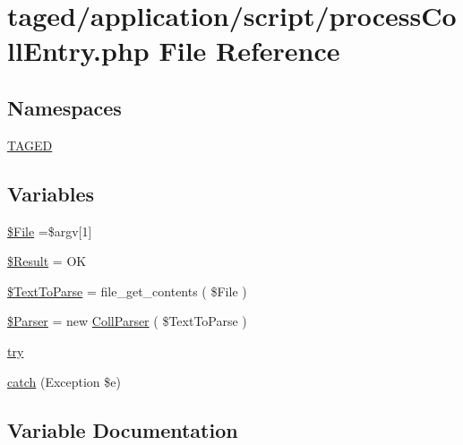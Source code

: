 \hypertarget{process_coll_entry_8php}{}\section{taged/application/script/process\+Coll\+Entry.php File Reference}
\label{process_coll_entry_8php}
\subsection*{Namespaces}
\begin{DoxyCompactItemize}
\item 
 \hyperlink{namespace_t_a_g_e_d}{T\+A\+G\+ED}
\end{DoxyCompactItemize}
\subsection*{Variables}
\begin{DoxyCompactItemize}
\item 
\hyperlink{process_coll_entry_8php_a34cd105e27a4cb6632047ddfdfaa07e8}{\$\+File} =\$argv\mbox{[}1\mbox{]}
\item 
\hyperlink{process_coll_entry_8php_a390d5702f3c15330fd764dbf08d5b2db}{\$\+Result} = \textquotesingle{}OK\textquotesingle{}
\item 
\hyperlink{process_coll_entry_8php_a10c4e7128659358fd113a24723be7c33}{\$\+Text\+To\+Parse} = file\+\_\+get\+\_\+contents ( \$File )
\item 
\hyperlink{process_coll_entry_8php_a42131fa99eb3e643989858979c5314b9}{\$\+Parser} = new \hyperlink{class_coll_parser}{Coll\+Parser} ( \$Text\+To\+Parse )
\item 
\hyperlink{process_coll_entry_8php_abe4cc9788f52e49485473dc699537388}{try}
\item 
\hyperlink{process_coll_entry_8php_a9ee42195f2b26ca51b7b816b4f28113e}{catch} (Exception \$e)
\end{DoxyCompactItemize}


\subsection{Variable Documentation}
\mbox{\label{process_coll_entry_8php_a34cd105e27a4cb6632047ddfdfaa07e8}} 
